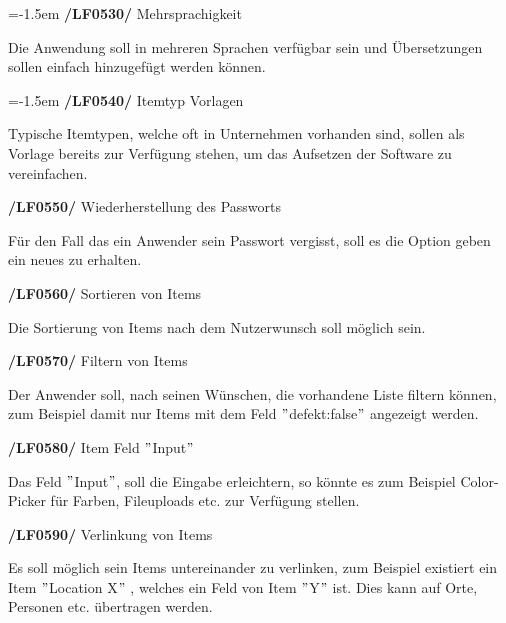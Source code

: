 \documentclass[11pt,a4paper]{report}
\begin{document}
\leftskip=-1.5em
\textbf{/LF0530/} Mehrsprachigkeit
\par
\begingroup
\leftskip=1cm
\noindent Die Anwendung soll in mehreren Sprachen verfügbar sein und Übersetzungen sollen einfach hinzugefügt werden können.\\
\par
\endgroup

\leftskip=-1.5em
\textbf{/LF0540/} Itemtyp Vorlagen
\par
\begingroup
\leftskip=1cm
\noindent Typische Itemtypen, welche oft in Unternehmen vorhanden sind,
sollen als Vorlage bereits zur Verfügung stehen, um das Aufsetzen der Software zu vereinfachen.\\
\par
\endgroup

\textbf{/LF0550/} Wiederherstellung des Passworts
\par
\begingroup
\leftskip=1cm
\noindent Für den Fall das ein Anwender sein Passwort vergisst, soll es die Option geben ein neues zu erhalten.\\
\par
\endgroup

\textbf{/LF0560/} Sortieren von Items
\par
\begingroup
\leftskip=1cm
\noindent Die Sortierung von Items nach dem Nutzerwunsch soll möglich sein.\\
\par
\endgroup

\textbf{/LF0570/} Filtern von Items
\par
\begingroup
\leftskip=1cm
\noindent Der Anwender soll, nach seinen Wünschen, die vorhandene Liste filtern können, zum Beispiel damit nur Items mit dem Feld $"$defekt:false$"$ angezeigt werden.\\
\par
\endgroup

\textbf{/LF0580/} Item Feld $"$Input$"$
\par
\begingroup
\leftskip=1cm
\noindent Das Feld $"$Input$"$, soll die Eingabe erleichtern, so könnte es zum Beispiel Color-Picker für Farben, Fileuploads etc. zur Verfügung stellen.\\
\par
\endgroup

\newpage
\textbf{/LF0590/} Verlinkung von Items
\par
\begingroup
\leftskip=1cm
\noindent Es soll möglich sein Items untereinander zu verlinken, zum Beispiel existiert ein Item $"$Location X$"$ , welches ein Feld von Item $"$Y$"$ ist.
Dies kann auf Orte, Personen etc. übertragen werden.\\
\par
\endgroup
\end{document}
